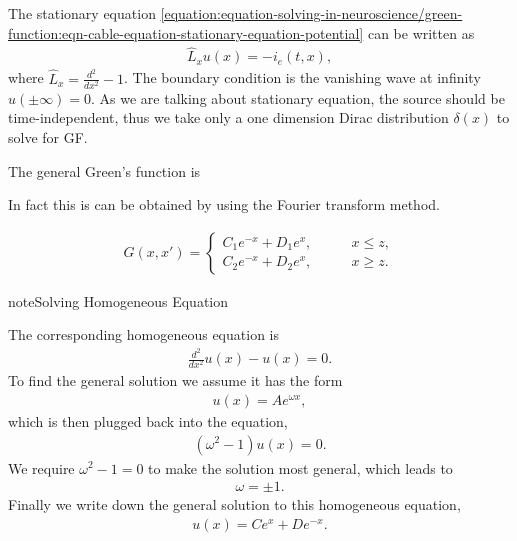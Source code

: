\documentclass[letterpaper,10pt,english]{sphinxmanual}
\begin{document}
The stationary equation \eqref{equation:equation-solving-in-neuroscience/green-function:eqn-cable-equation-stationary-equation-potential} can be written as
\begin{equation*}
\begin{split}\hat L_x u(x) = - i_e(t,x),\end{split}
\end{equation*}
where \(\hat L_x = \frac{d^2}{dx^2} -1\). The boundary condition is the vanishing wave at infinity \(u(\pm\infty)=0\). As we are talking about stationary equation, the source should be time-independent, thus we take only a one dimension Dirac distribution \(\delta(x)\) to solve for GF.

The general Green’s function is %
\begin{footnote}[1]\sphinxAtStartFootnote
In fact this is can be obtained by using the Fourier transform method.
%
\end{footnote}
\begin{equation*}
\begin{split}G(x,x') = \begin{cases}
C_1 e^{-x} + D_1 e^{x}, & \qquad x\leq z,\\
C_2 e^{-x} + D_2 e^{x}, & \qquad x\geq z.
\end{cases}\end{split}
\end{equation*}
\begin{sphinxadmonition}{note}{Solving Homogeneous Equation}

The corresponding homogeneous equation is
\begin{equation*}
\begin{split}\frac{d^2}{dx^2} u(x) - u(x) = 0.\end{split}
\end{equation*}
To find the general solution we assume it has the form
\begin{equation*}
\begin{split}u(x) = A e^{\omega x},\end{split}
\end{equation*}
which is then plugged back into the equation,
\begin{equation*}
\begin{split}(\omega^2 - 1) u(x) = 0.\end{split}
\end{equation*}
We require \(\omega^2-1=0\) to make the solution most general, which leads to
\begin{equation*}
\begin{split}\omega = \pm 1.\end{split}
\end{equation*}
Finally we write down the general solution to this homogeneous equation,
\begin{equation*}
\begin{split}u(x) = C e^{x} + D e^{-x}.\end{split}
\end{equation*}\end{sphinxadmonition}
\end{document}
